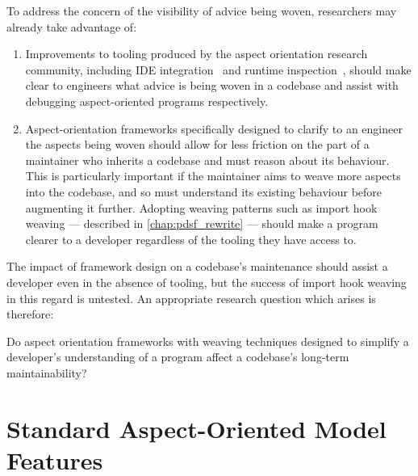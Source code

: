 To address the concern of the visibility of advice being woven, researchers may
already take advantage of:

\begin{enumerate}
    \item Improvements to tooling produced by the aspect orientation research
    community, including IDE integration~\cite{clement2003eclipseAJDT} and
    runtime inspection~\cite{mehner2002towards}, should make clear to engineers
    what advice is being woven in a codebase and assist with debugging
    aspect-oriented programs respectively.
    \item Aspect-orientation frameworks specifically designed to clarify to an
    engineer the aspects being woven should allow for less friction on the part
    of a maintainer who inherits a codebase and must reason about its behaviour.
    This is particularly important if the maintainer aims to weave more aspects
    into the codebase, and so must understand its existing behaviour before
    augmenting it further. Adopting weaving patterns such as import hook weaving
    --- described in \cref{chap:pdsf_rewrite} --- should make a program clearer
    to a developer regardless of the tooling they have access to.
\end{enumerate}

The impact of framework design on a codebase's maintenance should assist a
developer even in the absence of tooling, but the success of import hook weaving
in this regard is untested. An appropriate research question which arises is
therefore:

\begin{researchquestion}
Do aspect orientation frameworks with weaving techniques designed to simplify a
developer's understanding of a program affect a codebase's long-term
maintainability?
\end{researchquestion}


\section{Standard Aspect-Oriented Model
Features}
\label{standard_aosm_model_features}

